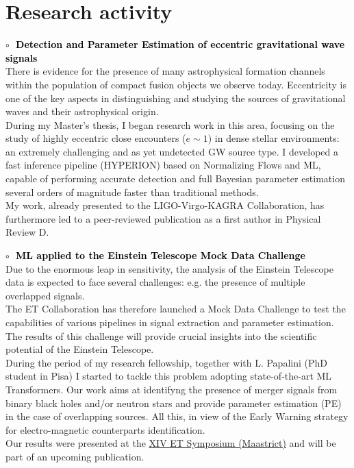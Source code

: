 \section{Research activity}
\textbf{\textcolor{black}{\hspace{0.4cm}$\circ\;$ Detection and Parameter Estimation of eccentric gravitational wave signals}}\vspace{0.05cm}\\
\indent There is evidence for the presence of many astrophysical formation channels within the
population of compact fusion objects we observe today.
Eccentricity is one of the key aspects in distinguishing and studying the sources of
gravitational waves and their astrophysical origin.\\
During my Master's thesis, I began research work in this area, focusing on the study of highly
eccentric close encounters ($e\sim1$) in dense stellar environments: an extremely challenging and
as yet undetected GW source type.
I developed a fast inference pipeline (\textsc{HYPERION}) based on Normalizing Flows and ML,
capable of performing accurate detection and full Bayesian parameter estimation several
orders of magnitude faster than traditional methods.\\
My work, already presented to the LIGO-Virgo-KAGRA Collaboration, has furthermore led to a
peer-reviewed publication as a first author in Physical Review D.
\medskip

\textbf{\textcolor{black}{\hspace{0.4cm}$\circ\;$ ML applied to the Einstein Telescope Mock Data Challenge}}\vspace{0.05cm}\\
\indent Due to the enormous leap in sensitivity, the analysis of the Einstein Telescope data is
expected to face several challenges: e.g. the presence of multiple overlapped signals.\\
The ET Collaboration has therefore launched a Mock Data Challenge to test the capabilities of
various pipelines in signal extraction and parameter estimation. The results of this challenge
will provide crucial insights into the scientific potential of the Einstein Telescope.\\
During the period of my research fellowship, together with L. Papalini (PhD student in Pisa) I
started to tackle this problem adopting state-of-the-art ML Transformers. Our work aims at
identifyng the presence of merger signals from binary black holes and/or neutron stars and
provide parameter estimation (PE) in the case of overlapping sources. All this, in view of the Early Warning
strategy for electro-magnetic counterparts identification.\\
Our results were presented at the \href{https://indico.ego-gw.it/event/710/}{XIV ET Symposium (Maastrict)} and will be 
part of an upcoming publication.

